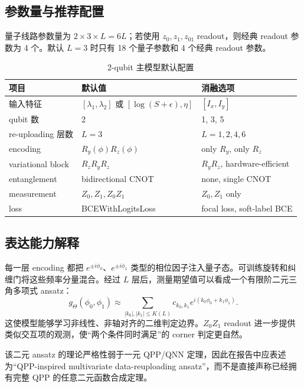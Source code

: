 \documentclass[UTF8,zihao=-4]{ctexart}
\begin{document}
\subsection{参数量与推荐配置}

量子线路参数量为 $2\times 3\times L=6L$；若使用 $z_0,z_1,z_{01}$ readout，则经典 readout 参数为 4 个。默认 $L=3$ 时只有 18 个量子参数和 4 个经典 readout 参数。

\begin{table}[H]
\centering
\caption{2-qubit 主模型默认配置}
\begin{tabular}{lll}
\toprule
项目 & 默认值 & 消融选项 \\
\midrule
输入特征 & $[\lambda_1,\lambda_2]$ 或 $[\log(S+\epsilon),\eta]$ & $[I_x,I_y]$ \\
qubit 数 & 2 & 1, 3, 5 \\
re-uploading 层数 & $L=3$ & $L=1,2,4,6$ \\
encoding & $R_y(\phi)R_z(\phi)$ & only $R_y$, only $R_z$ \\
variational block & $R_zR_yR_z$ & $R_yR_z$, hardware-efficient \\
entanglement & bidirectional CNOT & none, single CNOT \\
measurement & $Z_0,Z_1,Z_0Z_1$ & $Z_0,Z_1$ only \\
loss & BCEWithLogitsLoss & focal loss, soft-label BCE \\
\bottomrule
\end{tabular}
\end{table}

\subsection{表达能力解释}

每一层 encoding 都把 $e^{\pm i\phi_0}$、$e^{\pm i\phi_1}$ 类型的相位因子注入量子态。可训练旋转和纠缠门将这些频率分量混合。经过 $L$ 层后，测量期望值可以看成一个有限阶二元三角多项式 ansatz：
\begin{equation}
    g_\Theta(\phi_0,\phi_1)
    \approx \sum_{|k_0|,|k_1|\le K(L)} c_{k_0,k_1}
    e^{i(k_0\phi_0+k_1\phi_1)}.
\end{equation}
这使模型能够学习非线性、非轴对齐的二维判定边界。$Z_0Z_1$ readout 进一步提供类似交互项的观测，使“两个条件同时满足”的 corner 判定更自然。

该二元 ansatz 的理论严格性弱于一元 QPP/QNN 定理，因此在报告中应表述为“QPP-inspired multivariate data-reuploading ansatz”，而不是直接声称已经拥有完整 QPP 的任意二元函数合成定理。
\end{document}
